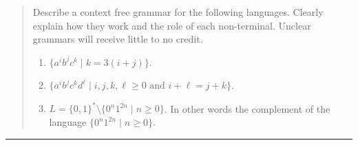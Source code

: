 \documentclass[11pt]{article}
\begin{document}


\begin{quote}

\item Describe a context free grammar for the following languages.
Clearly explain how they work and the role of each non-terminal.
Unclear grammars will receive little to no credit.
\begin{enumerate}
\item $\{a^ib^jc^k \mid k = 3(i+j)\}$.
\item $\{a^ib^jc^kd^\ell \mid  i,j,k,\ell \ge 0 \mbox{~and~} i+\ell = j+k\}$.
\item $L = \{0,1\}^* \setminus \{ 0^n1^{2n} \mid n \ge 0\}$. In other words
the complement of the language $\{ 0^n1^{2n} \mid n \ge 0\}$.
\end{enumerate}

\end{quote}
\hrule
\end{document}
